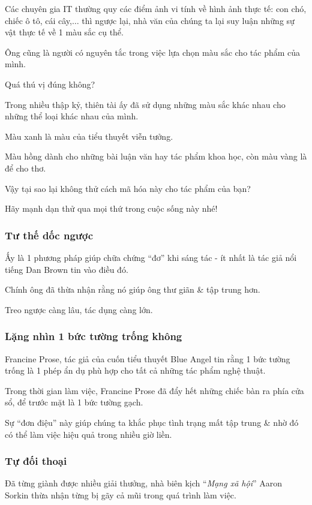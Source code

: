\documentclass{article}
\begin{document}
Các chuyên gia IT thường quy các điểm ảnh vi tính về hình ảnh thực tế: con chó, chiếc ô tô, cái cây,$\ldots$ thì ngược lại, nhà văn của chúng ta lại suy luận những sự vật thực tế về 1 màu sắc cụ thể. 

Ông cũng là người có nguyên tắc trong việc lựa chọn màu sắc cho tác phẩm của mình.

Quá thú vị đúng không?

Trong nhiều thập kỷ, thiên tài ấy đã sử dụng những màu sắc khác nhau cho những thể loại khác nhau của mình.

Màu xanh là màu của tiểu thuyết viễn tưởng.

Màu hồng dành cho những bài luận văn hay tác phẩm khoa học, còn màu vàng là để cho thơ.

Vậy tại sao lại không thử cách mã hóa này cho tác phẩm của bạn?

Hãy mạnh dạn thử qua mọi thứ trong cuộc sống này nhé!

\subsubsection{Tư thế dốc ngược}
Ấy là 1 phương pháp giúp chữa chứng ``đơ'' khi sáng tác -  ít nhất là tác giả nổi tiếng Dan Brown tin vào điều đó.

Chính ông đã thừa nhận rằng nó giúp ông thư giãn \& tập trung hơn.

Treo ngược càng lâu, tác dụng càng lớn.

\subsubsection{Lặng nhìn 1 bức tường trống không}
Francine Prose, tác giả của cuốn tiểu thuyết Blue Angel tin rằng 1 bức tường trống là 1 phép ẩn dụ phù hợp cho tất cả những tác phẩm nghệ thuật.

Trong thời gian làm việc, Francine Prose đã đẩy hết những chiếc bàn ra phía cửa sổ, để trước mặt là 1 bức tường gạch.

Sự ``đơn điệu''  này giúp chúng ta khắc phục tình trạng mất tập trung \& nhờ đó có thể làm việc hiệu quả trong nhiều giờ liền.

\subsubsection{Tự đối thoại}
Đã từng giành được nhiều giải thưởng, nhà biên kịch ``\textit{Mạng xã hội}'' Aaron Sorkin thừa nhận từng bị gãy cả mũi trong quá trình làm việc.
\end{document}
